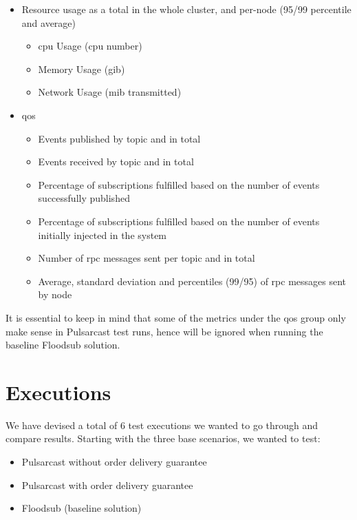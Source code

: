 \begin{itemize}
  \item Resource usage as a total in the whole cluster, and per-node (95/99
  percentile and average)
  \begin{itemize}
    \item \acrshort{cpu} Usage (\acrshort{cpu} number)
    \item Memory Usage (\acrshort{gib})
    \item Network Usage (\acrshort{mib} transmitted)
  \end{itemize}
  \item \acrshort{qos}
  \begin{itemize}
    \item Events published by topic and in total
    \item Events received by topic and in total
    \item Percentage of subscriptions fulfilled based on the number of events
    successfully published
    \item Percentage of subscriptions fulfilled based on the number of events
    initially injected in the system
    \item Number of \acrshort{rpc} messages sent per topic and in total
    \item Average, standard deviation and percentiles (99/95) of \acrshort{rpc} messages
    sent by node
  \end{itemize}
\end{itemize}

It is essential to keep in mind that some of the metrics under the \acrshort{qos} group
only make sense in Pulsarcast test runs, hence will be ignored when running the
baseline Floodsub solution.

\section{Executions}\label{executions}

We have devised a total of 6 test executions we wanted to go through and
compare results. Starting with the three base scenarios, we wanted to test:

\begin{itemize}
  \item Pulsarcast without order delivery guarantee
  \item Pulsarcast with order delivery guarantee
  \item Floodsub (baseline solution)
\end{itemize}

